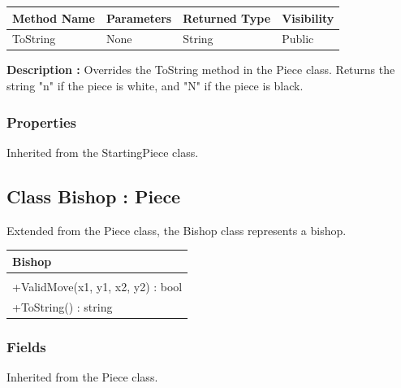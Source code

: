 \documentclass[12pt]{article}
\begin{document}
    \begin{table}[H]
        \begin{tabular}{|l|l|l|l|}
            \hline
            \rowcolor[HTML]{EFEFEF}
            \cellcolor[HTML]{EFEFEF}\textbf{Method Name} & \textbf{Parameters} & \textbf{Returned Type} & \textbf{Visibility} \\ \hline
            ToString                                     & None                & String                 & Public              \\ \hline
        \end{tabular}
    \end{table}

    \textbf{Description :} Overrides the ToString method in the Piece class.
    Returns the string "n" if the piece is white, and "N" if the piece is black.

    \subsubsection{Properties}

    Inherited from the StartingPiece class.

    \newpage


    \subsection{Class Bishop : Piece}

    Extended from the Piece class, the Bishop class represents a bishop.
    \begin{table}[H]
        \begin{tabular}{|l|}
            \hline
            \cellcolor[HTML]{C0C0C0}\textbf{Bishop} \\ \hline
            \cellcolor[HTML]{EFEFEF}                \\ \hline
            +ValidMove(x1, y1, x2, y2) : bool       \\ \hline
            +ToString() : string                    \\ \hline
        \end{tabular}
    \end{table}

    \subsubsection{Fields}

    Inherited from the Piece class.
\end{document}
